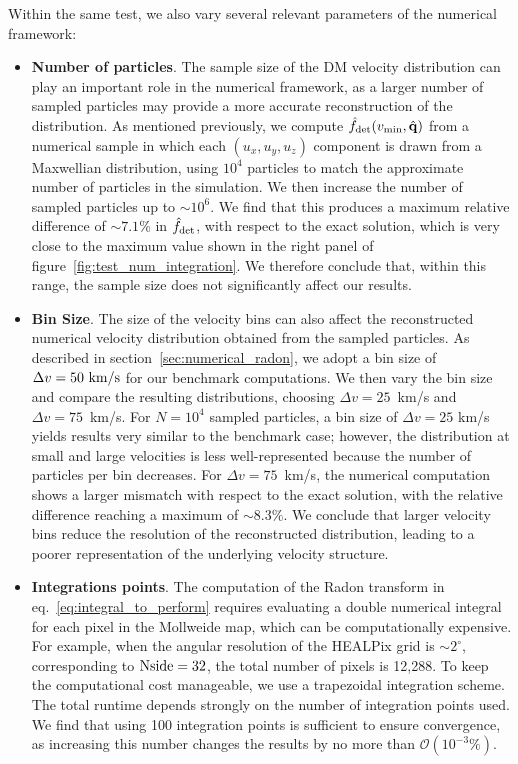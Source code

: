 \documentclass[a4paper,11pt]{article}
\begin{document}
Within the same test, we also vary several relevant parameters of the numerical framework:

\begin{itemize}

    \item \textbf{Number of particles}. The sample size of the DM velocity distribution can play an important role in the numerical framework, as a larger number of sampled particles may provide a more accurate reconstruction of the distribution. As mentioned previously, we compute $\hat{f}_{\rm{det}}(v_{\rm min},\hat{\mathbf{q}})$ from a numerical sample in which each $(u_x,u_y,u_z)$ component is drawn from a Maxwellian distribution, using $ 10^4$ particles to match the approximate number of particles in the simulation. We then increase the number of sampled particles up to $\sim 10^6$. We find that this produces a maximum relative difference of $\sim 7.1$\% in $\hat f_{\rm det}$, with respect  to the exact solution, 
   which is very close to the maximum value shown in the right panel of figure~\ref{fig:test_num_integration}. We therefore conclude that, within this range, the sample size does not significantly affect our results.

    
    \item \textbf{Bin Size}. The size of the velocity bins can also affect the reconstructed numerical velocity distribution obtained from the sampled particles. As described in section~\ref{sec:numerical_radon}, we adopt a bin size of $\Delta v = 50~\rm{km}/\rm{s}$ for our benchmark computations. We then vary the bin size and compare the resulting distributions, choosing $\Delta v = 25$~km/s and $\Delta v = 75$~km/s. For $N=10^{4}$ sampled particles, a bin size of $\Delta v = 25$ km/s yields results very similar to the benchmark case; however, the distribution at small and large velocities is less well-represented because the number of particles per bin decreases. For $\Delta v = 75$~km/s, the numerical computation shows a larger mismatch with respect to the exact solution, with the relative difference reaching a maximum of $\sim 8.3 \%$. We conclude that larger velocity bins reduce the resolution of the reconstructed distribution, leading to a poorer representation of the underlying velocity structure.



    \item \textbf{Integrations points}. The computation of the Radon transform in eq.~\eqref{eq:integral_to_perform} requires evaluating a double numerical integral for each pixel in the Mollweide map, which can be computationally expensive. For example, when the angular resolution of the HEALPix grid is $\sim 2^\circ$, corresponding to  ${\rm Nside} = 32$, the total number of pixels is 12,288. To keep the computational cost manageable, we use a trapezoidal integration scheme. The total runtime depends strongly on the number of integration points used. We find that using 100 integration points is sufficient to ensure convergence, as increasing this number changes the results by no more than $\mathcal{O}(10^{-3}\%)$.


\end{itemize}
\end{document}
